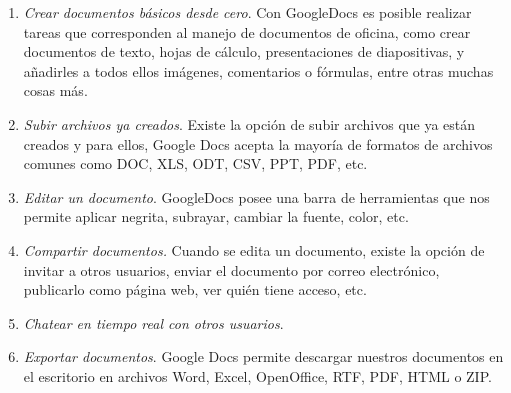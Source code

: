 \begin{enumerate}
  \item \emph{Crear documentos básicos desde cero}. Con GoogleDocs es posible realizar tareas que corresponden al manejo de documentos de oficina, como crear documentos de texto, hojas de cálculo, presentaciones de diapositivas, y añadirles a todos ellos imágenes, comentarios o fórmulas, entre otras muchas cosas más.
  \item \emph{Subir archivos ya creados}. Existe la opción de subir archivos que ya están creados y para ellos, Google Docs acepta la mayoría de formatos de archivos comunes como DOC, XLS, ODT, CSV, PPT, PDF, etc.
  \item \emph{Editar un documento}. GoogleDocs posee una barra de herramientas que nos permite aplicar negrita, subrayar, cambiar la fuente, color, etc.
  \item \emph{Compartir documentos.} Cuando se edita un documento, existe la opción de invitar a otros usuarios, enviar el documento por correo electrónico, publicarlo como página web, ver quién tiene acceso, etc.
  \item \emph{Chatear en tiempo real con otros usuarios}.
  \item \emph{Exportar documentos}. Google Docs permite descargar nuestros documentos en el escritorio en archivos Word, Excel, OpenOffice, RTF, PDF, HTML o ZIP.
\end{enumerate}

